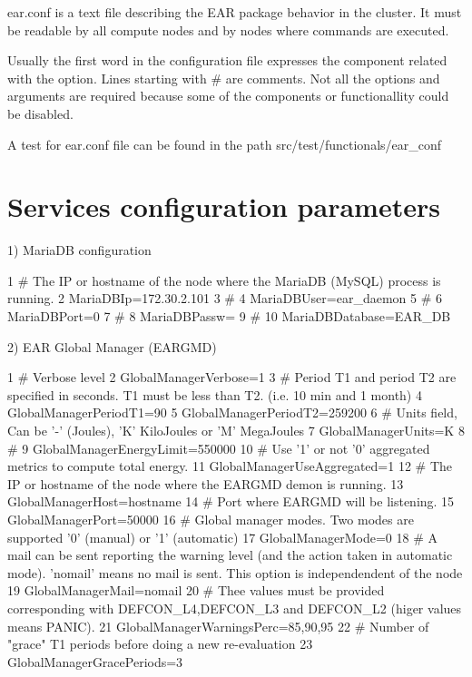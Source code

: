{\ttfamily ear.\+conf} is a text file describing the E\+AR package behavior in the cluster. It must be readable by all compute nodes and by nodes where commands are executed.

Usually the first word in the configuration file expresses the component related with the option. Lines starting with \# are comments. Not all the options and arguments are required because some of the components or functionallity could be disabled.

A test for ear.\+conf file can be found in the path {\ttfamily src/test/functionals/ear\+\_\+conf}

\section*{Services configuration parameters}

1) Maria\+DB configuration


\begin{DoxyCode}
1 # The IP or hostname of the node where the MariaDB (MySQL) process is running.
2 MariaDBIp=172.30.2.101
3 #
4 MariaDBUser=ear\_daemon
5 #
6 MariaDBPort=0
7 #
8 MariaDBPassw=
9 #
10 MariaDBDatabase=EAR\_DB
\end{DoxyCode}


2) E\+AR Global Manager (E\+A\+R\+G\+MD)


\begin{DoxyCode}
1 # Verbose level
2 GlobalManagerVerbose=1
3 # Period T1 and period T2 are specified in seconds. T1 must be less than T2. (i.e. 10 min and 1 month)
4 GlobalManagerPeriodT1=90
5 GlobalManagerPeriodT2=259200
6 # Units field, Can be '-' (Joules), 'K' KiloJoules or 'M' MegaJoules
7 GlobalManagerUnits=K
8 #
9 GlobalManagerEnergyLimit=550000
10 # Use '1' or not '0' aggregated metrics to compute total energy.
11 GlobalManagerUseAggregated=1
12 # The IP or hostname of the node where the EARGMD demon is running.
13 GlobalManagerHost=hostname
14 # Port where EARGMD will be listening.
15 GlobalManagerPort=50000
16 # Global manager modes. Two modes are supported '0' (manual) or '1' (automatic)
17 GlobalManagerMode=0
18 # A mail can be sent reporting the warning level (and the action taken in automatic mode). 'nomail' means
       no mail is sent. This option is independendent of the node
19 GlobalManagerMail=nomail
20 # Thee values must be provided corresponding with DEFCON\_L4,DEFCON\_L3 and DEFCON\_L2 (higer values means
       PANIC).
21 GlobalManagerWarningsPerc=85,90,95
22 # Number of "grace" T1 periods before doing a new re-evaluation
23 GlobalManagerGracePeriods=3
\end{DoxyCode}


